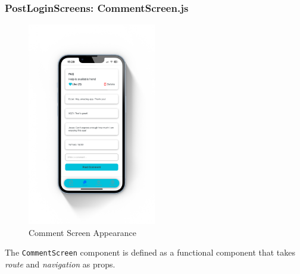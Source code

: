 \subsubsection{PostLoginScreens: CommentScreen.js}

\begin{figure}[!ht]
    \centering
    \includegraphics[width=0.5\textwidth]
    {LATEX/Appendices/Images/Software/Frontend/comment_screen.png}
    \caption{Comment Screen Appearance}
    \label{fig:comment screen}
\end{figure}

The \texttt{CommentScreen} component is defined as a functional component that takes \textit{route} and \textit{navigation} as props.

